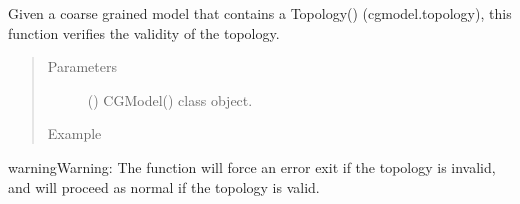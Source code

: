 \documentclass[letterpaper,12pt,english,openany,oneside]{sphinxmanual}
\begin{document}
\begin{fulllineitems}
\label{\detokenize{build:build.cg_build.verify_topology}}
Given a coarse grained model that contains a Topology() (cgmodel.topology), this function verifies the validity of the topology.
\begin{quote}\begin{description}
\item[{Parameters}] \leavevmode
{} () \textendash{} CGModel() class object.

\item[{Example}] \leavevmode
\end{description}\end{quote}

\begin{sphinxVerbatim}[commandchars=\\\{\}]
   
  
\end{sphinxVerbatim}

\begin{sphinxadmonition}{warning}{Warning:}
The function will force an error exit if the topology is invalid, and will proceed as normal if the topology is valid.
\end{sphinxadmonition}

\end{fulllineitems}

\end{document}
